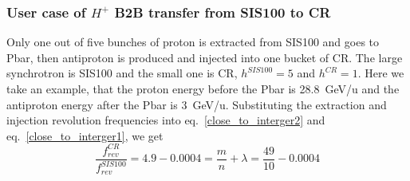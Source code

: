 %
%
\subsubsection{User case of $H^{+}$ B2B transfer from SIS100 to CR} 
Only one out of five bunches of proton is extracted from SIS100 and goes to Pbar, then antiproton is produced and injected into one bucket of CR. The large synchrotron is SIS100 and the small one is CR, $h^{SIS100}=5$ and $h^{CR}=1$. Here we take an example, that the proton energy before the Pbar is \SI{28.8}{GeV/\atomicmassunit} and the antiproton energy after the Pbar is \SI{3}{GeV/\atomicmassunit}. Substituting the extraction and injection revolution frequencies into eq.~\ref{close_to_interger2} and eq.~\ref{close_to_interger1}, we get
\begin{equation} 
\frac{f_{rev}^{CR}}{f_{rev}^{SIS100}}=4.9-0.0004=\frac{m}{n}+ \lambda=\frac{49}{10}-0.0004
\end{equation}

